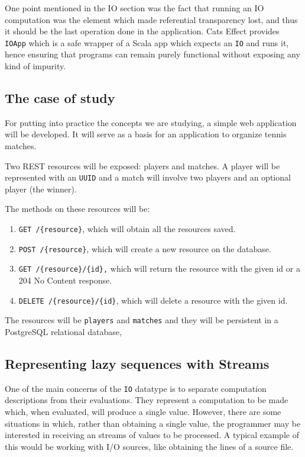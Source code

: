 \documentclass[../main.tex]{subfiles}
\begin{document}
One point mentioned in the IO section was the fact that running an IO computation was the
element which made referential transparency lost, and thus it should be the last
operation done in the application. Cats Effect provides \texttt{IOApp} which is
a safe wrapper of a Scala app which expects an \texttt{IO} and runs it, hence ensuring
that programs can remain purely functional without exposing any kind of impurity.

\subsection{The case of study}
For putting into practice the concepts we are studying, a simple web application will be
developed. It will serve as a basis for an application to organize tennis
matches.

Two REST resources will be exposed: players and matches. A player will be
represented with an \texttt{UUID} and a match will involve two players and an optional
player (the winner).

The methods on these resources will be:
\begin{enumerate}
\item \texttt{GET /\{resource\}}, which will obtain all the resources saved.
\item \texttt{POST /\{resource\}}, which will create a new resource on the
  database.
\item \texttt{GET /\{resource\}/\{id\},} which will return the resource with the
  given id or a 204 No Content response.
\item \texttt{DELETE /\{resource\}/\{id\}}, which will delete a resource with the
  given id.
\end{enumerate}

The resources will be \texttt{players} and \texttt{matches} and they will be
persistent in a PostgreSQL relational database,

\subsection{Representing lazy sequences with Streams}
One of the main concerns of the \texttt{IO} datatype is to separate computation
descriptions from their evaluations. They represent a computation to be
made which, when evaluated, will produce a single value. However, there are some
situations in which, rather than obtaining a single value, the programmer may be
interested in receiving an streams of values to be processed. A typical example
of this would be working with I/O sources, like obtaining the lines of a source
file.
\end{document}
